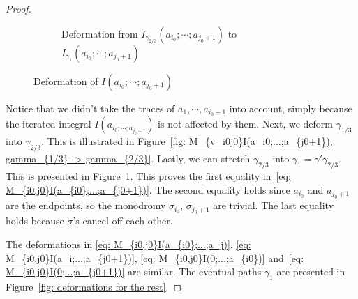 \begin{proof}
\begin{figure}[H]
\begin{subfigure}[b]{0.8\textwidth}
\caption{Deformation from $I_{\gamma_{2/3}}(a_{i_0};\cdots;a_{j_0+1})$ to $I_{\gamma_1}(a_{i_0};\cdots;a_{j_0+1})$}
\label{fig: M_{v_i0j0}I(a_i0;...;a_{j0+1}), gamma_{2/3} -> gamma_1}
\end{subfigure}

\caption{Deformation of $I(a_{i_0};\cdots;a_{j_0+1})$}
\label{fig: M_{v_i0j0}I(a_i0;...;a_{j0+1})}
\end{figure}

Notice that we didn't take the traces of $a_1,\cdots, a_{i_0-1}$ into account, simply because the iterated integral $I(a_{i_0;\cdots;a_{j_0+1}})$ is not affected by them. Next, we deform $\gamma_{1/3}$ into $\gamma_{2/3}$. This is illustrated in Figure~\ref{fig: M_{v_i0j0}I(a_i0;...;a_{j0+1}), gamma_{1/3} -> gamma_{2/3}}. Lastly, we can stretch $\gamma_{2/3}$ into $\gamma_1=\gamma'\gamma_{2/3}$. This is presented in Figure~\ref{fig: M_{v_i0j0}I(a_i0;...;a_{j0+1}), gamma_{2/3} -> gamma_1}. This proves the first equality in~\eqref{eq: M_{i0,j0}I(a_{i0};...;a_{j0+1})}. The second equality holds since $a_{i_0}$ and $a_{j_0+1}$ are the endpoints, so the monodromy $\sigma_{i_0}$, $\sigma_{j_0+1}$ are trivial. The last equality holds because $\sigma$'s cancel off each other.

The deformations in \eqref{eq: M_{i0,j0}I(a_{i0};...;a_j)}, \eqref{eq: M_{i0,j0}I(a_i;...;a_{j0+1})}, \eqref{eq: M_{i0,j0}I(0;...;a_{i0})} and~\eqref{eq: M_{i0,j0}I(0;...;a_{j0+1})} are similar. The eventual paths $\gamma_1$ are presented in Figure~\ref{fig: deformations for the rest}.


\end{proof}
